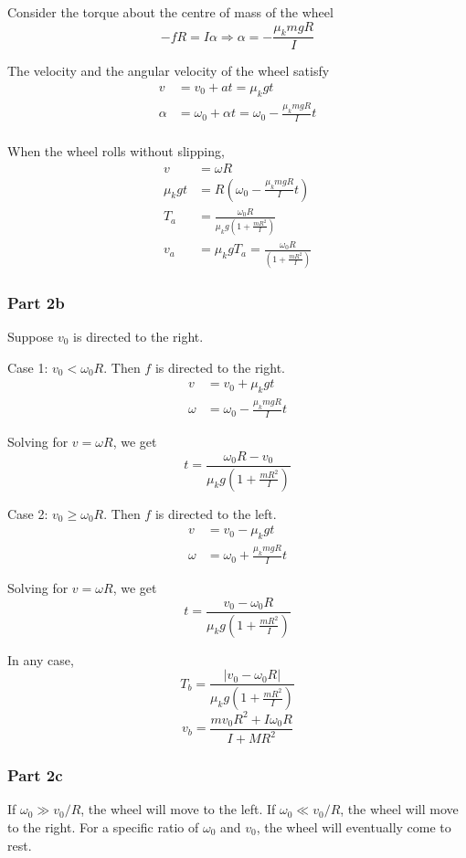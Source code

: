 \documentclass{article}
\begin{document}
Consider the torque about the centre of mass of the wheel
\[-fR = I\alpha \Rightarrow \alpha = -\frac{\mu_k mgR}{I}\]

The velocity and the angular velocity of the wheel satisfy
\begin{align}
v &= v_0 + at = \mu_k gt \\
\alpha &= \omega_0 + \alpha t = \omega_0 - \frac{\mu_k mgR}{I} t \\
\end{align}

When the wheel rolls without slipping, 
\begin{align}
v &= \omega R \\
\mu_k gt &= R\left(\omega_0 - \frac{\mu_k mgR}{I} t \right) \\
T_a &= \frac{\omega_0 R}{\mu_k g \left(1+\frac{mR^2}{I}\right)} \\
v_a &= \mu_kgT_a = \frac{\omega_0R}{\left(1+\frac{mR^2}{I}\right)}
\end{align}

\subsubsection{Part 2b}
Suppose $v_0$ is directed to the right.

Case 1: $v_0 < \omega_0 R$. Then $f$ is directed to the right. 
\begin{align}
v &= v_0 + \mu_kg t \\
\omega &= \omega_0 - \frac{\mu_k mgR}{I} t
\end{align}

Solving for $v=\omega R$, we get
\[t = \frac{\omega_0 R - v_0}{\mu_k g \left(1+\frac{mR^2}{I}\right)}\]

Case 2: $v_0 \geq \omega_0 R$. Then $f$ is directed to the left.
\begin{align}
v &= v_0 - \mu_kg t \\
\omega &= \omega_0 + \frac{\mu_k mgR}{I} t
\end{align}

Solving for $v=\omega R$, we get
\[t = \frac{v_0 - \omega_0 R}{\mu_k g \left(1+\frac{mR^2}{I}\right)}\]

In any case, 
\[T_b = \frac{|v_0 - \omega_0 R|}{\mu_k g \left(1+\frac{mR^2}{I}\right)}\]
\[v_b = \frac{mv_0R^2+I\omega_0R}{I+MR^2}\]

\subsubsection{Part 2c}
If $\omega_0 \gg v_0/R $, the wheel will move to the left. If $\omega_0 \ll v_0/R$, the wheel will move to the right. For a specific ratio of $\omega_0$ and $v_0$, the wheel will eventually come to rest. 
\end{document}
